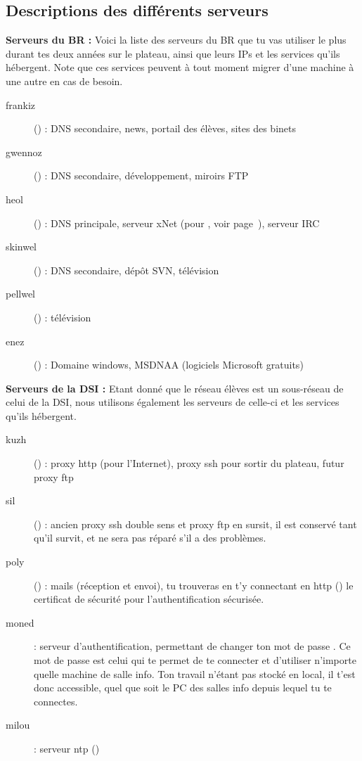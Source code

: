 \subsection{Descriptions des différents serveurs}
{\bf Serveurs du BR :} Voici la liste des serveurs du BR que tu vas
utiliser le plus durant tes deux années sur le plateau, ainsi que
leurs IPs et les services qu'ils hébergent. Note que ces services
peuvent à tout moment migrer d'une machine à une autre en cas de
besoin.


\begin{description}
        \item[frankiz] () : DNS secondaire,
        news, portail des élèves, sites des binets
        \item[gwennoz] () : DNS secondaire,
        développement, miroirs FTP
        \item[heol] () : DNS principale,
        serveur xNet (pour , voir page~\pageref{qrezix}), serveur IRC
        \item[skinwel] () : DNS secondaire,
        dépôt SVN, télévision
	\item[pellwel] () : télévision
    \item[enez] () : Domaine windows, MSDNAA (logiciels Microsoft gratuits)
\end {description}

{\bf Serveurs de la DSI : }Etant donné que le réseau élèves est un
sous-réseau de celui de la DSI, nous utilisons également les
serveurs de celle-ci et les services qu'ils hébergent.

\begin{description}
        \item[kuzh] () : proxy http (pour l'Internet), proxy ssh pour sortir du plateau, futur proxy ftp
        \item[sil] () : ancien proxy ssh double sens et proxy ftp en sursit, il est conservé tant qu'il survit, et ne sera pas réparé s'il a des problèmes.
        \item[poly] () : mails (réception et envoi), tu trouveras en t'y connectant en http () le certificat de sécurité pour l'authentification sécurisée.
        \item[moned] : serveur d'authentification, permettant de
        changer ton mot de passe . Ce mot de passe est celui qui
        te permet de te connecter et d'utiliser n'importe
        quelle machine de salle info. Ton travail n'étant pas stocké
        en local, il t'est donc accessible, quel que soit le PC des salles info depuis
        lequel tu te connectes.
    \item[milou] : serveur ntp ()
\end {description}

